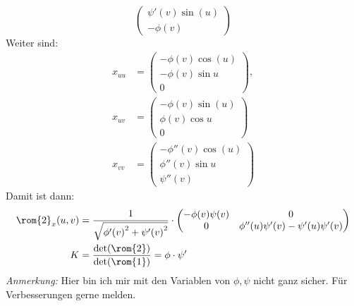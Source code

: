 \begin{problem}[2a]
\begin{equation*}
\begin{pmatrix}
      \psi'(v) \sin(u) \\
      -\phi(v)
    \end{pmatrix}
  \end{equation*}
  Weiter sind:
  \begin{align*}
    x_{uu} &= \begin{pmatrix}
      -\phi(v)\cos(u) \\
      -\phi(v) \sin u \\
      0
    \end{pmatrix}, \\
    x_{uv} &= \begin{pmatrix}
      -\phi(v)\sin(u) \\
      \phi(v) \cos u \\
      0
    \end{pmatrix} \\
    x_{vv} &= \begin{pmatrix}
      -\phi''(v)\cos(u) \\
      \phi''(v) \sin u \\
      \psi''(v)
    \end{pmatrix}	
  \end{align*}
  Damit ist dann: 
  \begin{align*}
    \rom{2}_x(u,v) &= \frac{1}{\sqrt{ {\phi'(v)}^2 + {\psi'(v)}^2}} \cdot \begin{pmatrix}
      -\phi(v) \psi(v) & 0 \\
      0 & \phi''(u) \psi'(v) - \psi'(u)\psi'(v)
    \end{pmatrix} \\ 
    K &= \frac{\det(\rom{2})}{\det(\rom{1})} = \phi \cdot \psi'
  \end{align*}
  \emph{Anmerkung:} Hier bin ich mir mit den Variablen von \( \phi, \psi \) nicht ganz sicher. Für Verbesserungen gerne melden. %
\end{problem}

